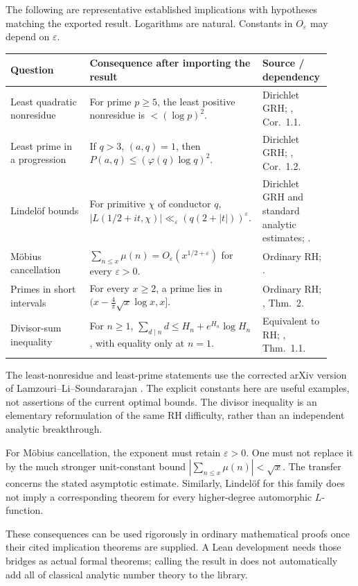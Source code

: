 The following are representative established implications with hypotheses matching the exported result. Logarithms are natural. Constants in \(O_\varepsilon\) may depend on \(\varepsilon\).

\begin{longtable}{P{0.24\linewidth}P{0.48\linewidth}P{0.20\linewidth}}
\toprule
Question & Consequence after importing the result & Source / dependency\\
\midrule
\endhead
Least quadratic nonresidue & For prime \(p\ge5\), the least positive nonresidue is \(<(\log p)^2\). & Dirichlet GRH; \cite{lls}, Cor.~1.1.\\[0.3em]
Least prime in a progression & If \(q>3\), \((a,q)=1\), then \(P(a,q)\le(\varphi(q)\log q)^2\). & Dirichlet GRH; \cite{lls}, Cor.~1.2.\\[0.3em]
Lindel\"of bounds & For primitive \(\chi\) of conductor \(q\), \(\lvert L(1/2+it,\chi)\rvert\ll_\varepsilon(q(2+|t|))^\varepsilon\). & Dirichlet GRH and standard analytic estimates; \cite{chandee}.\\[0.3em]
M\"obius cancellation & \(\sum_{n\le x}\mu(n)=O_\varepsilon(x^{1/2+\varepsilon})\) for every \(\varepsilon>0\). & Ordinary RH; \cite{sound}.\\[0.3em]
Primes in short intervals & For every \(x\ge2\), a prime lies in \((x-\frac4\pi\sqrt{x}\log x,x]\). & Ordinary RH; \cite{dudek}, Thm.~2.\\[0.3em]
Divisor-sum inequality & For \(n\ge1\), \(\sum_{d\mid n}d\le H_n+e^{H_n}\log H_n\), with equality only at \(n=1\). & Equivalent to RH; \cite{lagarias}, Thm.~1.1.\\
\bottomrule
\end{longtable}

The least-nonresidue and least-prime statements use the corrected arXiv version of Lamzouri--Li--Soundararajan \cite{lls}. The explicit constants here are useful examples, not assertions of the current optimal bounds. The divisor inequality is an elementary reformulation of the same RH difficulty, rather than an independent analytic breakthrough.

For M\"obius cancellation, the exponent must retain \(\varepsilon>0\). One must not replace it by the much stronger unit-constant bound \(|\sum_{n\le x}\mu(n)|<\sqrt{x}\). The transfer concerns the stated asymptotic estimate. Similarly, Lindel\"of for this family does not imply a corresponding theorem for every higher-degree automorphic \(L\)-function.

These consequences can be used rigorously in ordinary mathematical proofs once their cited implication theorems are supplied. A Lean development needs those bridges as actual formal theorems; calling the result in  does not automatically add all of classical analytic number theory to the library.

